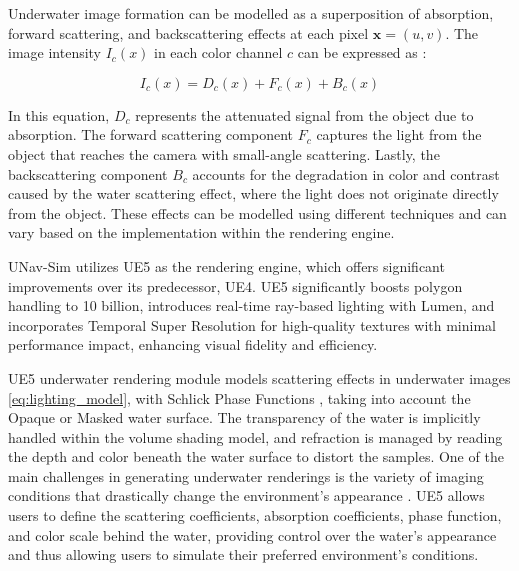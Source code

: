 Underwater image formation can be modelled as a superposition of absorption, forward scattering, and backscattering effects at each pixel $\textbf{x} = (u, v)$. The image intensity $I_c(x)$ in each color channel $c$ can be expressed as \cite{alvarez2019generation}:

\begin{equation}\label{eq:lighting_model}
I_c(x) = D_c(x) + F_c(x) + B_c(x)
\end{equation}

In this equation, $D_c$ represents the attenuated signal from the object due to absorption. The forward scattering component $F_c$ captures the light from the object that reaches the camera with small-angle scattering. Lastly, the backscattering component $B_c$ accounts for the degradation in color and contrast caused by the water scattering effect, where the light does not originate directly from the object. These effects can be modelled using different techniques and can vary based on the implementation within the rendering engine.









UNav-Sim utilizes \ac{UE5} as the rendering engine, which offers significant improvements over its predecessor, \ac{UE4}. \ac{UE5} significantly boosts polygon handling to 10 billion, introduces real-time ray-based lighting with Lumen, and incorporates Temporal Super Resolution for high-quality textures with minimal performance impact, enhancing visual fidelity and efficiency. 


\ac{UE5} underwater rendering module models scattering effects in underwater images \eqref{eq:lighting_model}, with Schlick Phase Functions \cite{schlick}, taking into account the Opaque or Masked water surface. 
The transparency of the water is implicitly handled within the volume shading model, %
and refraction is managed by reading the depth and color beneath the water surface to distort the samples.  
One of the main challenges in generating underwater renderings is the variety of imaging conditions that drastically change the environment's appearance \cite{akkaynak2017space}. \ac{UE5} allows users to define the scattering coefficients, absorption coefficients, phase function, and color scale behind the water, providing control over the water's appearance and thus allowing users to simulate their preferred environment's conditions. 


